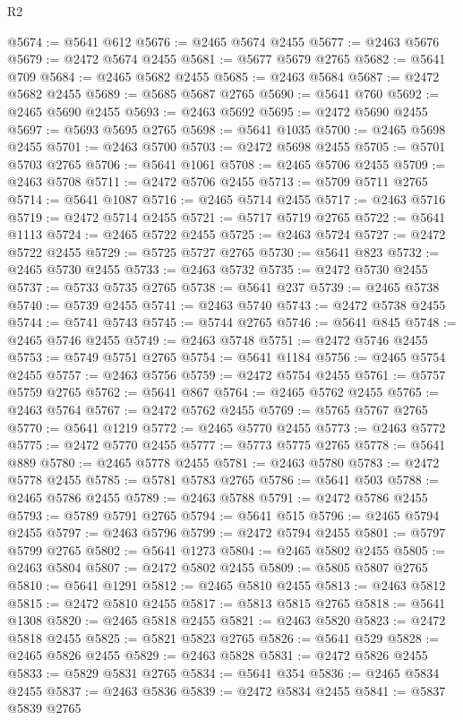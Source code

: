 \begin{lexlean}{R2}
\begin{coremodule}
@5674 := @5641 @612
@5676 := @2465 @5674 @2455
@5677 := @2463 @5676
@5679 := @2472 @5674 @2455
@5681 := @5677 @5679 @2765
@5682 := @5641 @709
@5684 := @2465 @5682 @2455
@5685 := @2463 @5684
@5687 := @2472 @5682 @2455
@5689 := @5685 @5687 @2765
@5690 := @5641 @760
@5692 := @2465 @5690 @2455
@5693 := @2463 @5692
@5695 := @2472 @5690 @2455
@5697 := @5693 @5695 @2765
@5698 := @5641 @1035
@5700 := @2465 @5698 @2455
@5701 := @2463 @5700
@5703 := @2472 @5698 @2455
@5705 := @5701 @5703 @2765
@5706 := @5641 @1061
@5708 := @2465 @5706 @2455
@5709 := @2463 @5708
@5711 := @2472 @5706 @2455
@5713 := @5709 @5711 @2765
@5714 := @5641 @1087
@5716 := @2465 @5714 @2455
@5717 := @2463 @5716
@5719 := @2472 @5714 @2455
@5721 := @5717 @5719 @2765
@5722 := @5641 @1113
@5724 := @2465 @5722 @2455
@5725 := @2463 @5724
@5727 := @2472 @5722 @2455
@5729 := @5725 @5727 @2765
@5730 := @5641 @823
@5732 := @2465 @5730 @2455
@5733 := @2463 @5732
@5735 := @2472 @5730 @2455
@5737 := @5733 @5735 @2765
@5738 := @5641 @237
@5739 := @2465 @5738
@5740 := @5739 @2455
@5741 := @2463 @5740
@5743 := @2472 @5738 @2455
@5744 := @5741 @5743
@5745 := @5744 @2765
@5746 := @5641 @845
@5748 := @2465 @5746 @2455
@5749 := @2463 @5748
@5751 := @2472 @5746 @2455
@5753 := @5749 @5751 @2765
@5754 := @5641 @1184
@5756 := @2465 @5754 @2455
@5757 := @2463 @5756
@5759 := @2472 @5754 @2455
@5761 := @5757 @5759 @2765
@5762 := @5641 @867
@5764 := @2465 @5762 @2455
@5765 := @2463 @5764
@5767 := @2472 @5762 @2455
@5769 := @5765 @5767 @2765
@5770 := @5641 @1219
@5772 := @2465 @5770 @2455
@5773 := @2463 @5772
@5775 := @2472 @5770 @2455
@5777 := @5773 @5775 @2765
@5778 := @5641 @889
@5780 := @2465 @5778 @2455
@5781 := @2463 @5780
@5783 := @2472 @5778 @2455
@5785 := @5781 @5783 @2765
@5786 := @5641 @503
@5788 := @2465 @5786 @2455
@5789 := @2463 @5788
@5791 := @2472 @5786 @2455
@5793 := @5789 @5791 @2765
@5794 := @5641 @515
@5796 := @2465 @5794 @2455
@5797 := @2463 @5796
@5799 := @2472 @5794 @2455
@5801 := @5797 @5799 @2765
@5802 := @5641 @1273
@5804 := @2465 @5802 @2455
@5805 := @2463 @5804
@5807 := @2472 @5802 @2455
@5809 := @5805 @5807 @2765
@5810 := @5641 @1291
@5812 := @2465 @5810 @2455
@5813 := @2463 @5812
@5815 := @2472 @5810 @2455
@5817 := @5813 @5815 @2765
@5818 := @5641 @1308
@5820 := @2465 @5818 @2455
@5821 := @2463 @5820
@5823 := @2472 @5818 @2455
@5825 := @5821 @5823 @2765
@5826 := @5641 @529
@5828 := @2465 @5826 @2455
@5829 := @2463 @5828
@5831 := @2472 @5826 @2455
@5833 := @5829 @5831 @2765
@5834 := @5641 @354
@5836 := @2465 @5834 @2455
@5837 := @2463 @5836
@5839 := @2472 @5834 @2455
@5841 := @5837 @5839 @2765

\end{coremodule}
\end{lexlean}
